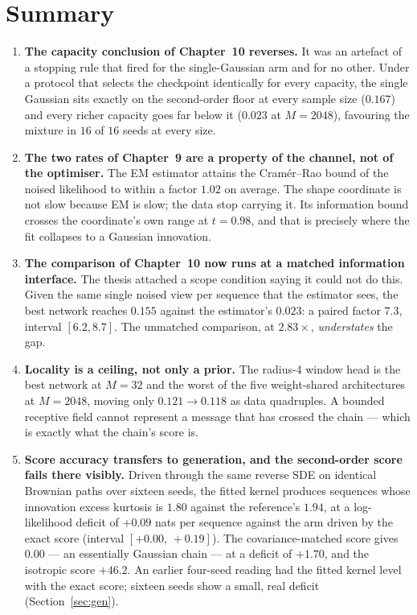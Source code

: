 \documentclass[11pt,a4paper]{article}
\newcommand{\hi}[1]{\textbf{#1}}
\begin{document}
\section{Summary}\label{sec:summary}

\begin{enumerate}
\item \hi{The capacity conclusion of Chapter~10 reverses.} It was an artefact of a stopping rule
that fired for the single-Gaussian arm and for no other. Under a protocol that selects the
checkpoint identically for every capacity, the single Gaussian sits exactly on the second-order
floor at every sample size ($0.167$) and every richer capacity goes far below it ($0.023$ at
$M=2048$), favouring the mixture in $16$ of $16$ seeds at every size.

\item \hi{The two rates of Chapter~9 are a property of the channel, not of the optimiser.} The EM
estimator attains the Cram\'er--Rao bound of the noised likelihood to within a factor $1.02$ on
average. The shape coordinate is not slow because EM is slow; the data stop carrying it. Its
information bound crosses the coordinate's own range at $t=0.98$, and that is precisely where the
fit collapses to a Gaussian innovation.

\item \hi{The comparison of Chapter~10 now runs at a matched information interface.} The thesis
attached a scope condition saying it could not do this. Given the same single noised view per
sequence that the estimator sees, the best network reaches $0.155$ against the estimator's
$0.023$: a paired factor $7.3$, interval $[6.2,8.7]$. The unmatched comparison, at $2.83\times$,
\emph{understates} the gap.

\item \hi{Locality is a ceiling, not only a prior.} The radius-4 window head is the best network at
$M=32$ and the worst of the five weight-shared architectures at $M=2048$, moving only
$0.121\rightarrow0.118$ as data quadruples. A bounded receptive field cannot represent a message
that has crossed the chain --- which is exactly what the chain's score is.

\item \hi{Score accuracy transfers to generation, and the second-order score fails there
visibly.} Driven through the same reverse SDE on identical Brownian paths over sixteen seeds, the
fitted kernel produces sequences whose innovation excess kurtosis is $1.80$ against the
reference's $1.94$, at a log-likelihood deficit of $+0.09$ nats per sequence against the arm
driven by the exact score (interval $[+0.00,\,+0.19]$). The covariance-matched score gives
$0.00$ --- an essentially Gaussian chain --- at a deficit of $+1.70$, and the isotropic score
$+46.2$. An earlier four-seed reading had the fitted kernel level with the exact score; sixteen
seeds show a small, real deficit (Section~\ref{sec:gen}).


\end{enumerate}
\end{document}
